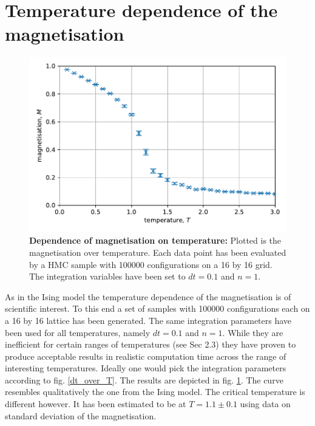 \documentclass[11pt, a4paper]{scrartcl}
\begin{document}
\section{Temperature dependence of the magnetisation}
    \begin{figure}
    \begin{centering}
        \includegraphics{m_over_T.pdf}
        \caption{\textbf{Dependence of magnetisation on temperature: } Plotted is the magnetisation over temperature. Each data point has been evaluated by a HMC sample with 100000 configurations on a 16 by 16 grid. The integration variables have been set to $dt = 0.1$ and $n = 1$.}
    \end{centering}
    \label{m_over_T}
    \end{figure}
    As in the Ising model the temperature dependence of the magnetisation is of scientific interest. To this end a set of samples with 100000 configurations each on a 16 by 16 lattice has been generated. The same integration parameters have been used for all temperatures, namely $dt = 0.1$ and $n = 1$. While they are inefficient for certain ranges of temperatures (see Sec 2.3) they have proven to produce acceptable results in realistic computation time across the range of interesting temperatures. Ideally one would pick the integration parameters according to fig. \ref{dt_over_T}. The results are depicted in fig. \ref{m_over_T}. The curve resembles qualitatively the one from the Ising model. The critical temperature is different however. It has been estimated to be at $T = 1.1 \pm 0.1$ using data on standard deviation of the magnetisation.
\end{document}
